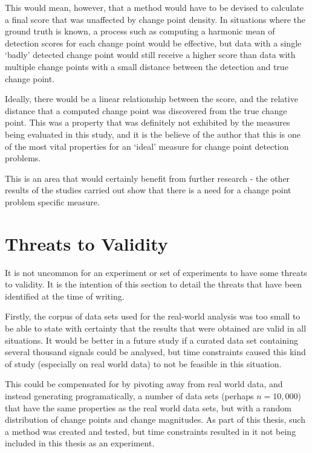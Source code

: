 \documentclass[../main.tex]{subfiles}
\begin{document}
This would mean, however, that a method would have to be devised to calculate a final score that was unaffected by change point density. In situations where the ground truth is known, a process such as computing a harmonic mean of detection scores for each change point would be effective, but data with a single `badly' detected change point would still receive a higher score than data with multiple change points with a small distance between the detection and true change point.

Ideally, there would be a linear relationship between the score, and the relative distance that a computed change point was discovered from the true change point. This was a property that was definitely not exhibited by the measures being evaluated in this study, and it is the believe of the author that this is one of the most vital properties for an `ideal' measure for change point detection problems.

This is an area that would certainly benefit from further research - the other results of the studies carried out show that there is a need for a change point problem specific measure.

\section{Threats to Validity}
\label{threats}

It is not uncommon for an experiment or set of experiments to have some threats to validity. It is the intention of this section to detail the threats that have been identified at the time of writing.

Firstly, the corpus of data sets used for the real-world analysis was too small to be able to state with certainty that the results that were obtained are valid in all situations. It would be better in a future study if a curated data set containing several thousand signals could be analysed, but time constraints caused this kind of study (especially on real world data) to not be feasible in this situation.

This could be compensated for by pivoting away from real world data, and instead generating programatically, a number of data sets (perhaps $n = 10,000$) that have the same properties as the real world data sets, but with a random distribution of change points and change magnitudes. As part of this thesis, such a method was created and tested, but time constraints resulted in it not being included in this thesis as an experiment.
\end{document}
